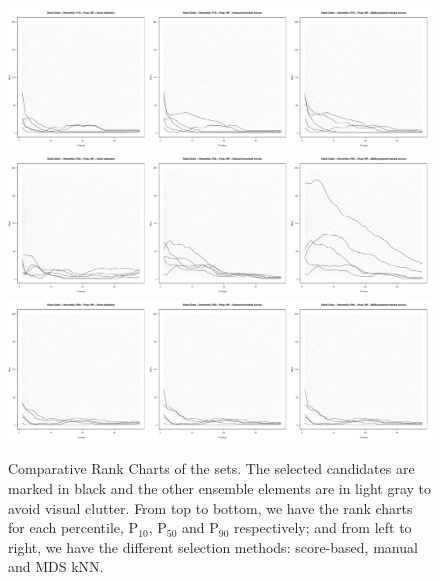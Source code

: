 \documentclass[final,5p,times,twocolumn]{elsarticle}
\begin{document}
\begin{figure}[H]
  \centering
  \includegraphics[width=\columnwidth]{figures/rank-score-brush-mds-p10.pdf}
  \includegraphics[width=\columnwidth]{figures/rank-score-brush-mds-p50.pdf}
  \includegraphics[width=\columnwidth]{figures/rank-score-brush-mds-p90.pdf}
  \caption{Comparative Rank Charts of the sets. The selected candidates are marked in black and the other ensemble elements are in light gray to avoid visual clutter. From top to bottom, we have the rank charts for each percentile, P$_{10}$, P$_{50}$ and P$_{90}$ respectively; and from left to right, we have the different selection methods: score-based, manual and MDS kNN.}
  \label{fig:rank-plots}
\end{figure}
\end{document}
